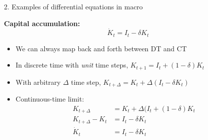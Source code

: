 \documentclass[10pt]{beamer}
\begin{document}
\begin{frame}{2. Examples of differential equations in macro}

\textbf{Capital accumulation:}
\begin{equation*}
	\dot K_t = I_t - \delta K_t
\end{equation*}
\begin{itemize}
\item We can always map back and forth between DT and CT

\item In discrete time with \textit{unit} time steps, $K_{t+1} = I_t + (1-\delta) K_t$

\item With arbitrary $\Delta$ time step, $K_{t+\Delta} = K_t + \Delta (I_t - \delta K_t)$

\item Continuous-time limit:
\begin{align*}
	K_{t+\Delta} &= K_t + \Delta (I_t + (1-\delta) K_t \\
	K_{t+\Delta} - K_t &= I_t -\delta K_t \\
	\dot K_t &= I_t -\delta K_t
\end{align*}
\end{itemize}
\end{frame}
\end{document}

